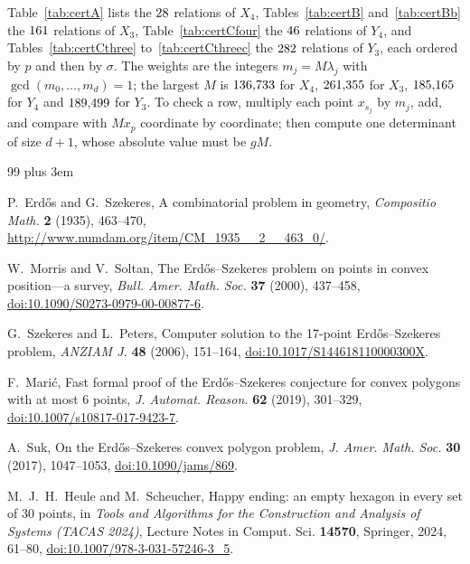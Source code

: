 \documentclass[aps,prd,twocolumn,superscriptaddress,nofootinbib,longbibliography,floatfix,showkeys,amsmath,amssymb,10pt]{revtex4-2}
\theoremstyle{plain}
\theoremstyle{definition}
\theoremstyle{plain}
\begin{document}
Table~\ref{tab:certA} lists the $28$ relations of $X_4$, Tables~\ref{tab:certB} and~\ref{tab:certBb} the $161$ relations of $X_3$, Table~\ref{tab:certCfour} the $46$ relations of $Y_4$, and Tables~\ref{tab:certCthree} to~\ref{tab:certCthreec} the $282$ relations of $Y_3$, each ordered by $p$ and then by $\sigma$. The weights are the integers $m_j=M\lambda_j$ with $\gcd(m_0,\dots,m_d)=1$; the largest $M$ is $136{,}733$ for $X_4$, $261{,}355$ for $X_3$, $185{,}165$ for $Y_4$ and $189{,}499$ for $Y_3$. To check a row, multiply each point $x_{s_j}$ by $m_j$, add, and compare with $Mx_p$ coordinate by coordinate; then compute one determinant of size $d+1$, whose absolute value must be $gM$.

\begin{thebibliography}{99}\rightskip=0pt plus 3em

 P.~Erd\H{o}s and G.~Szekeres, A combinatorial problem in geometry, \emph{Compositio Math.} \textbf{2} (1935), 463--470, \url{http://www.numdam.org/item/CM_1935__2__463_0/}.

 W.~Morris and V.~Soltan, The Erd\H{o}s--Szekeres problem on points in convex position---a survey, \emph{Bull. Amer. Math. Soc.} \textbf{37} (2000), 437--458, \href{https://doi.org/10.1090/S0273-0979-00-00877-6}{doi:10.1090/S0273-0979-00-00877-6}.

 G.~Szekeres and L.~Peters, Computer solution to the 17-point Erd\H{o}s--Szekeres problem, \emph{ANZIAM J.} \textbf{48} (2006), 151--164, \href{https://doi.org/10.1017/S144618110000300X}{doi:10.1017/S144618110000300X}.

 F.~Mari\'c, Fast formal proof of the Erd\H{o}s--Szekeres conjecture for convex polygons with at most 6 points, \emph{J. Automat. Reason.} \textbf{62} (2019), 301--329, \href{https://doi.org/10.1007/s10817-017-9423-7}{doi:10.1007/s10817-017-9423-7}.

 A.~Suk, On the Erd\H{o}s--Szekeres convex polygon problem, \emph{J. Amer. Math. Soc.} \textbf{30} (2017), 1047--1053, \href{https://doi.org/10.1090/jams/869}{doi:10.1090/jams/869}.

 M.~J.~H.~Heule and M.~Scheucher, Happy ending: an empty hexagon in every set of 30 points, in \emph{Tools and Algorithms for the Construction and Analysis of Systems (TACAS 2024)}, Lecture Notes in Comput. Sci. \textbf{14570}, Springer, 2024, 61--80, \href{https://doi.org/10.1007/978-3-031-57246-3_5}{doi:10.1007/978-3-031-57246-3\_5}.


\end{thebibliography}
\end{document}

